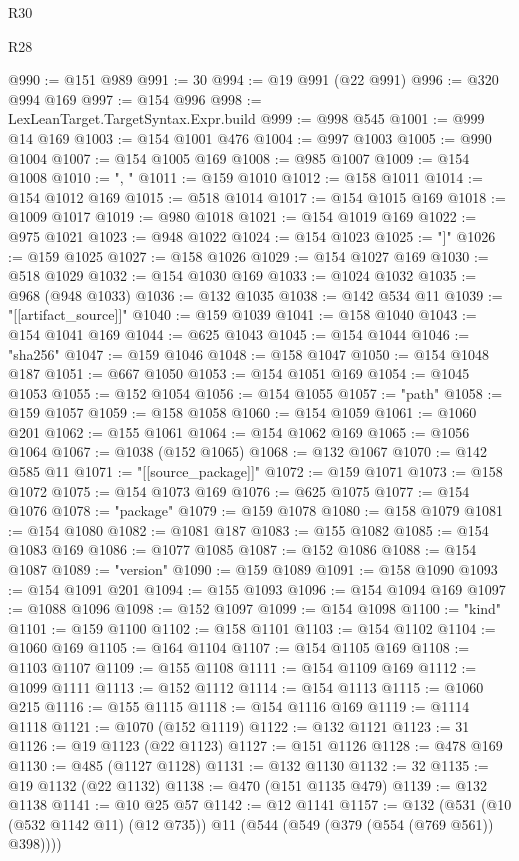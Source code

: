 \begin{lexlean}{R30}
\begin{lexlean}{R28}
\begin{coremodule}
{{{{{{{{{{{{{{{{{{{{{{{{{{{{{{{{{{{{{{{{{{{{{{{{{{{{{{{{{{{{{{{{{{{{{{{{{{{{{{{{{{{{{{{{{{{{{{{{{{{{{{{{{{{{{{{{{{{{{{{{{{{{{{{{{{{{{{{{{{{{{{{@990 := @151 @989
@991 := 30
@994 := @19 @991 (@22 @991)
@996 := @320 @994 @169
@997 := @154 @996
@998 := LexLeanTarget.TargetSyntax.Expr.build
@999 := @998 @545
@1001 := @999 @14 @169
@1003 := @154 @1001 @476
@1004 := @997 @1003
@1005 := @990 @1004
@1007 := @154 @1005 @169
@1008 := @985 @1007
@1009 := @154 @1008
@1010 := ", "
@1011 := @159 @1010
@1012 := @158 @1011
@1014 := @154 @1012 @169
@1015 := @518 @1014
@1017 := @154 @1015 @169
@1018 := @1009 @1017
@1019 := @980 @1018
@1021 := @154 @1019 @169
@1022 := @975 @1021
@1023 := @948 @1022
@1024 := @154 @1023
@1025 := "]"
@1026 := @159 @1025
@1027 := @158 @1026
@1029 := @154 @1027 @169
@1030 := @518 @1029
@1032 := @154 @1030 @169
@1033 := @1024 @1032
@1035 := @968 (@948 @1033)
@1036 := @132 @1035
@1038 := @142 @534 @11
@1039 := "[[artifact_source]]"
@1040 := @159 @1039
@1041 := @158 @1040
@1043 := @154 @1041 @169
@1044 := @625 @1043
@1045 := @154 @1044
@1046 := "sha256"
@1047 := @159 @1046
@1048 := @158 @1047
@1050 := @154 @1048 @187
@1051 := @667 @1050
@1053 := @154 @1051 @169
@1054 := @1045 @1053
@1055 := @152 @1054
@1056 := @154 @1055
@1057 := "path"
@1058 := @159 @1057
@1059 := @158 @1058
@1060 := @154 @1059
@1061 := @1060 @201
@1062 := @155 @1061
@1064 := @154 @1062 @169
@1065 := @1056 @1064
@1067 := @1038 (@152 @1065)
@1068 := @132 @1067
@1070 := @142 @585 @11
@1071 := "[[source_package]]"
@1072 := @159 @1071
@1073 := @158 @1072
@1075 := @154 @1073 @169
@1076 := @625 @1075
@1077 := @154 @1076
@1078 := "package"
@1079 := @159 @1078
@1080 := @158 @1079
@1081 := @154 @1080
@1082 := @1081 @187
@1083 := @155 @1082
@1085 := @154 @1083 @169
@1086 := @1077 @1085
@1087 := @152 @1086
@1088 := @154 @1087
@1089 := "version"
@1090 := @159 @1089
@1091 := @158 @1090
@1093 := @154 @1091 @201
@1094 := @155 @1093
@1096 := @154 @1094 @169
@1097 := @1088 @1096
@1098 := @152 @1097
@1099 := @154 @1098
@1100 := "kind"
@1101 := @159 @1100
@1102 := @158 @1101
@1103 := @154 @1102
@1104 := @1060 @169
@1105 := @164 @1104
@1107 := @154 @1105 @169
@1108 := @1103 @1107
@1109 := @155 @1108
@1111 := @154 @1109 @169
@1112 := @1099 @1111
@1113 := @152 @1112
@1114 := @154 @1113
@1115 := @1060 @215
@1116 := @155 @1115
@1118 := @154 @1116 @169
@1119 := @1114 @1118
@1121 := @1070 (@152 @1119)
@1122 := @132 @1121
@1123 := 31
@1126 := @19 @1123 (@22 @1123)
@1127 := @151 @1126
@1128 := @478 @169
@1130 := @485 (@1127 @1128)
@1131 := @132 @1130
@1132 := 32
@1135 := @19 @1132 (@22 @1132)
@1138 := @470 (@151 @1135 @479)
@1139 := @132 @1138
@1141 := @10 @25 @57
@1142 := @12 @1141
@1157 := @132
    (@531 (@10 (@532 @1142 @11) (@12 @735)) @11 (@544 (@549 (@379 (@554 (@769 @561)) @398))))
}}}}}}}}}}}}}}}}}}}}}}}}}}}}}}}}}}}}}}}}}}}}}}}}}}}}}}}}}}}}}}}}}}}}}}}}}}}}}}}}}}}}}}}}}}}}}}}}}}}}}}}}}}}}}}}}}}}}}}}}}}}}}}}}}}}}}}}}}}}}}}}
\end{coremodule}
\end{lexlean}
\end{lexlean}
